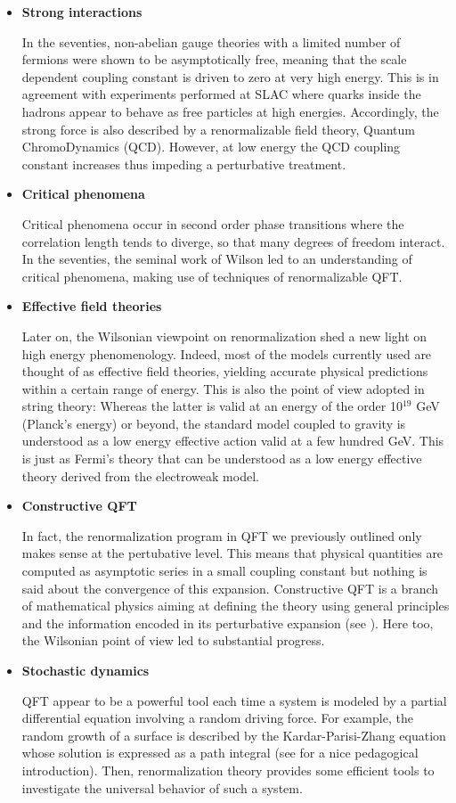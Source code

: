 \documentclass[12pt,here,feynmf]{article}
\begin{document}
\begin{itemize}
\item
{\bf Strong interactions}

In the seventies, non-abelian gauge theories with a limited number of fermions were shown to be asymptotically free, meaning that the scale dependent coupling constant is driven to zero at very high energy. This is in agreement with experiments performed at SLAC where quarks inside the hadrons appear to behave as free particles at high energies. Accordingly, the strong force is also described by a renormalizable field theory, Quantum ChromoDynamics (QCD).  However, at low energy the QCD coupling constant increases thus impeding a perturbative treatment.

\item
{\bf Critical phenomena}

Critical phenomena occur in second order phase transitions where the correlation length tends to diverge, so that many degrees of freedom interact. In the seventies, the seminal work of  Wilson led to an understanding of critical phenomena, making use of techniques of renormalizable QFT.    

\item
{\bf Effective field theories}

Later on, the Wilsonian viewpoint on renormalization shed a new light on high energy phenomenology. Indeed, most of the models currently used are thought of as effective field theories, yielding accurate physical predictions within a certain range of energy. This is also the point of view adopted in string theory: Whereas the latter is valid at an energy of the order 10$^{19}$ GeV (Planck's energy) or beyond, the standard model coupled to gravity is understood as a low energy effective action valid at a few hundred GeV. This is just as Fermi's theory that can be understood as a low energy effective theory derived from the electroweak model.
    

\item
{\bf Constructive QFT}

In fact, the renormalization program in QFT we previously outlined only makes sense at the pertubative level. This means that physical quantities are computed as asymptotic series in a small coupling constant but nothing is said about the  convergence of this expansion. Constructive QFT  is a branch of mathematical physics aiming at defining the theory using general principles and the information encoded in its perturbative expansion (see \cite{constructive}). Here too, the Wilsonian point of view led to substantial progress.  

\item
{\bf Stochastic dynamics}

QFT appear to be a powerful tool each time a system is modeled by a partial differential equation involving a random driving force. For example, the random growth of a surface is described by the Kardar-Parisi-Zhang equation whose solution is expressed as a path integral (see \cite{zee} for a nice pedagogical introduction). Then, renormalization theory provides some efficient tools to investigate the universal behavior of such a system.

\end{itemize}
\end{document}
